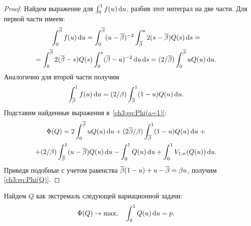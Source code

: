{\begin{proof}
  Найдем выражение для $\int_0^1 f(u) \di u$, разбив этот интеграл на две части.
  Для первой части имеем:
  \begin{multline*}
    \int_0^\DCo f(u) \di u = \int_0^\DCo (u - \DCo)^{-2} \int_\DCo^u 2(s - \DCo) Q(s) \di s = \\
    = \int_0^\DCo 2 (\DCo - s) Q(s) \int_0^s (\DCo - u)^{-2} \di u \di s =
    (2/\DCo) \int_0^\DCo u Q(u) \di u.
  \end{multline*}
  Аналогично для второй части получим
  \begin{gather*}
    \int_\DCo^1 f(u) \di u = (2/\Co) \int_\DCo^1 (1-u) Q(u) \di u.
  \end{gather*}
  Подставим найденные выражения в~\eqref{ch3:eq:Phi(a=1)}:
  \begin{multline*}
    \Phi(Q) = 2 \int_0^\DCo u Q(u) \di u + (2\DCo/\Co) \int_\DCo^1 (1-u) Q(u) \di u \; + \\
    + (2/\Co) \int_\DCo^1 (u - \DCo) Q(u) \di u - \int_0^1 Q(u) \di u + \int_0^1
    V_{1,n}(Q(u)) \di u.
  \end{multline*}
  Приведя подобные с учетом равенства $\DCo (1-u) + u - \DCo = \Co u$, получим
  \eqref{ch3:eq:Phi(Q)}.
\end{proof}

Найдем $Q$ как экстремаль следующей вариационной задачи:
\begin{align}
  \label{ch3:eq:Q-Problem}
  \Phi(Q) \rightarrow \max, \quad
  \int_0^1 Q(u) \di u = p.
\end{align}

}
